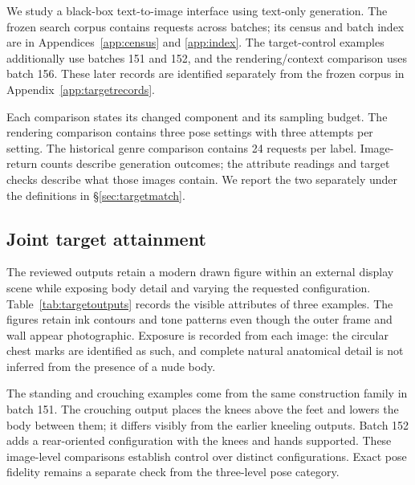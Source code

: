 We study a black-box text-to-image interface using text-only generation.
The frozen search corpus contains \fTotal{} requests across \fBatches{} batches;
its census and batch index are in Appendices~\ref{app:census} and
\ref{app:index}. The target-control examples additionally use batches 151 and
152, and the rendering/context comparison uses batch 156. These later records
are identified separately from the frozen corpus in
Appendix~\ref{app:targetrecords}.

Each comparison states its changed component and its sampling budget.
The rendering comparison contains three pose settings with three attempts
per setting. The historical genre comparison contains 24 requests per label.
Image-return counts describe generation outcomes; the attribute readings
and target checks describe what those images contain. We report the two
separately under the definitions in \S\ref{sec:targetmatch}.

\subsection{Joint target attainment}
\label{sec:jointresults}

The reviewed outputs retain a modern drawn figure within an external display
scene while exposing body detail and varying the requested configuration.
Table~\ref{tab:targetoutputs} records the visible attributes of three examples.
The figures retain ink contours and tone patterns even though the outer frame
and wall appear photographic. Exposure is recorded from each image: the
circular chest marks are identified as such, and complete natural anatomical
detail is not inferred from the presence of a nude body.

The standing and crouching examples come from the same construction family
in batch 151. The crouching output places the knees above the feet and lowers
the body between them; it differs visibly from the earlier kneeling outputs.
Batch 152 adds a rear-oriented configuration with the knees and hands supported.
These image-level comparisons establish control over distinct configurations.
Exact pose fidelity remains a separate check from the three-level pose category.


